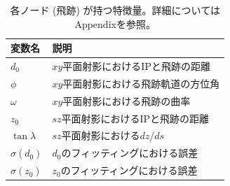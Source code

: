 \begin{table}[H]
\centering
 \begin{tabular}{ l  l }
 \hline
 変数名 & 説明\\
 \hline
 \hline
 $d_0$ & $xy$平面射影におけるIPと飛跡の距離\\
 $\phi$ & $xy$平面射影における飛跡軌道の方位角\\
 $\omega$ & $xy$平面射影における飛跡の曲率\\
 $z_0$ & $sz$平面射影におけるIPと飛跡の距離\\
 $\tan{\lambda}$ &  $sz$平面射影における$dz/ds$\\
 $\sigma(d_0)$ & $d_0$のフィッティングにおける誤差\\
 $\sigma(z_0)$ & $z_0$のフィッティングにおける誤差\\
 \hline
 \end{tabular}
 \label{gnnin}
 \caption{各ノード (飛跡) が持つ特徴量。詳細についてはAppendixを参照。}
\end{table}

